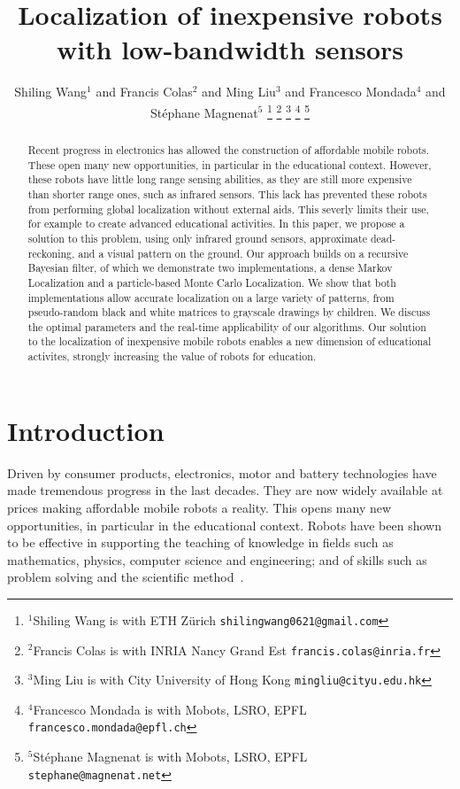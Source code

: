 \documentclass[letterpaper, 10pt, conference]{ieeeconf}
\title{\LARGE \bf
Localization of inexpensive robots with low-bandwidth sensors
}
\author{Shiling Wang$^{1}$ and Francis Colas$^{2}$ and Ming Liu$^{3}$ and Francesco Mondada$^{4}$ and Stéphane Magnenat$^{5}$%
\thanks{$^{1}$Shiling Wang is with ETH Zürich
        {\tt\small shilingwang0621@gmail.com}}%
\thanks{$^{2}$Francis Colas is with INRIA Nancy Grand Est
        {\tt\small francis.colas@inria.fr}}%
\thanks{$^{3}$Ming Liu is with City University of Hong Kong
        {\tt\small mingliu@cityu.edu.hk}}%
\thanks{$^{4}$Francesco Mondada is with Mobots, LSRO, EPFL
        {\tt\small francesco.mondada@epfl.ch}}%
\thanks{$^{5}$Stéphane Magnenat is with Mobots, LSRO, EPFL
        {\tt\small stephane@magnenat.net}}%
}
\begin{document}
\maketitle
\thispagestyle{empty}
\pagestyle{empty}

\begin{abstract}
Recent progress in electronics has allowed the construction of affordable mobile robots.
These open many new opportunities, in particular in the educational context.
However, these robots have little long range sensing abilities, as they are still more expensive than shorter range ones, such as infrared sensors.
This lack has prevented these robots from performing global localization without external aids.
This severly limits their use, for example to create advanced educational activities.
In this paper, we propose a solution to this problem, using only infrared ground sensors, approximate dead-reckoning, and a visual pattern on the ground.
Our approach builds on a recursive Bayesian filter, of which we demonstrate two implementations, a dense Markov Localization and a particle-based Monte Carlo Localization.
We show that both implementations allow accurate localization on a large variety of patterns, from pseudo-random black and white matrices to grayscale drawings by children.
We discuss the optimal parameters and the real-time applicability of our algorithms.
Our solution to the localization of inexpensive mobile robots enables a new dimension of educational activites, strongly increasing the value of robots for education.
\end{abstract}

\section{Introduction}

Driven by consumer products, electronics, motor and battery technologies have made tremendous progress in the last decades.
They are now widely available at prices making affordable mobile robots a reality.
This opens many new opportunities, in particular in the educational context.
Robots have been shown to be effective in supporting the teaching of knowledge in fields such as mathematics, physics, computer science and engineering; and of skills such as problem solving and the scientific method~\cite{benitti2012explorin}.
\end{document}
